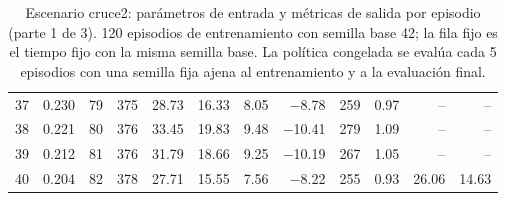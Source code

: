 \begin{table}[H]
\begin{tabular}{rrrrrrrrrrrr}
37 & 0.230 & 79 & 375 & 28.73 & 16.33 & 8.05 & $-$8.78 & 259 & 0.97 & -- & -- \\
38 & 0.221 & 80 & 376 & 33.45 & 19.83 & 9.48 & $-$10.41 & 279 & 1.09 & -- & -- \\
39 & 0.212 & 81 & 376 & 31.79 & 18.66 & 9.25 & $-$10.19 & 267 & 1.05 & -- & -- \\
40 & 0.204 & 82 & 378 & 27.71 & 15.55 & 7.56 & $-$8.22 & 255 & 0.93 & 26.06 & 14.63 \\
\bottomrule
\end{tabular}
\caption[Escenario cruce2: episodios de entrenamiento (parte 1 de 3)]{Escenario cruce2: parámetros de entrada y métricas de salida por episodio (parte 1 de 3). 120 episodios de entrenamiento con semilla base 42; la fila fijo es el tiempo fijo con la misma semilla base. La política congelada se evalúa cada 5 episodios con una semilla fija ajena al entrenamiento y a la evaluación final.}
\label{tab:cruce2-episodios}
\end{table}

